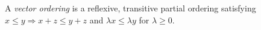 A \emph{vector ordering} is a reflexive, transitive partial ordering satisfying $x\leqslant y\Rightarrow x+z\leqslant y+z$ and $\lambda x\leqslant\lambda y$ for $\lambda\geqslant0$.
